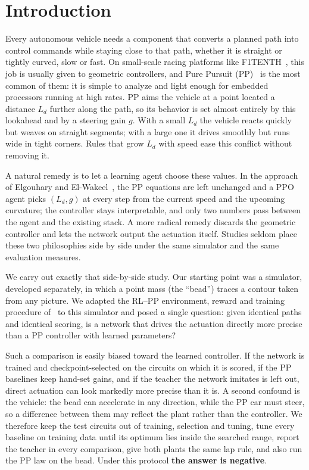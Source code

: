 \documentclass[conference]{IEEEtran}
\begin{document}
\section{Introduction}
Every autonomous vehicle needs a component that converts a planned path into control commands while staying close to that path, whether it is straight or tightly curved, slow or fast. On small-scale racing platforms like F1TENTH~\cite{okelly2020}, this job is usually given to geometric controllers, and Pure Pursuit (PP)~\cite{coulter1992,snider2009} is the most common of them: it is simple to analyze and light enough for embedded processors running at high rates. PP aims the vehicle at a point located a distance $L_d$ further along the path, so its behavior is set almost entirely by this lookahead and by a steering gain $g$. With a small $L_d$ the vehicle reacts quickly but weaves on straight segments; with a large one it drives smoothly but runs wide in tight corners. Rules that grow $L_d$ with speed ease this conflict without removing it.

A natural remedy is to let a learning agent choose these values. In the approach of Elgouhary and El-Wakeel~\cite{elgouhary2026}, the PP equations are left unchanged and a PPO~\cite{schulman2017} agent picks $(L_d,g)$ at every step from the current speed and the upcoming curvature; the controller stays interpretable, and only two numbers pass between the agent and the existing stack. A more radical remedy discards the geometric controller and lets the network output the actuation itself. Studies seldom place these two philosophies side by side under the same simulator and the same evaluation measures.

We carry out exactly that side-by-side study. Our starting point was a simulator, developed separately, in which a point mass (the ``bead'') traces a contour taken from any picture. We adapted the RL--PP environment, reward and training procedure of~\cite{elgouhary2026} to this simulator and posed a single question: given identical paths and identical scoring, is a network that drives the actuation directly more precise than a PP controller with learned parameters?

Such a comparison is easily biased toward the learned controller. If the network is trained and checkpoint-selected on the circuits on which it is scored, if the PP baselines keep hand-set gains, and if the teacher the network imitates is left out, direct actuation can look markedly more precise than it is. A second confound is the vehicle: the bead can accelerate in any direction, while the PP car must steer, so a difference between them may reflect the plant rather than the controller. We therefore keep the test circuits out of training, selection and tuning, tune every baseline on training data until its optimum lies inside the searched range, report the teacher in every comparison, give both plants the same lap rule, and also run the PP law on the bead. Under this protocol \textbf{the answer is negative}.
\end{document}
